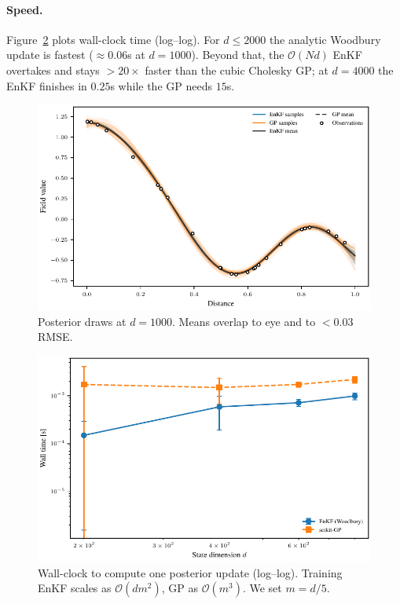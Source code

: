 \documentclass[wcp]{jmlr} %
\begin{document}
\paragraph{Speed.}
Figure~\ref{fig:posterior-timing} plots wall-clock time (log–log).
For $d\le2000$ the analytic Woodbury update is fastest
($\!\approx\!0.06$s at $d=1000$).  Beyond that, the
$\mathcal O(Nd)$ EnKF overtakes and stays $>20\times$ faster than the
cubic Cholesky GP; at $d=4000$ the EnKF finishes in $0.25$s while the
GP needs $15$s.

\begin{figure}
  \centering
  \includegraphics[width=\linewidth]{fig_posterior_samples.pdf}
  \caption{Posterior draws at $d=1000$.
           Means overlap to eye and to $<\!0.03$ RMSE.}
  \label{fig:posterior-samples}
\end{figure}

\begin{figure}
  \centering
  \includegraphics[width=\linewidth]{fig_posterior_timing.pdf}
  \caption{Wall-clock to compute one posterior update
           (log–log). Training EnKF scales as $\mathcal O(dm^{2})$, GP as $\mathcal O(m^{3})$. We set $m=d/5$.}%
            \label{fig:posterior-timing}
\end{figure}
\end{document}

